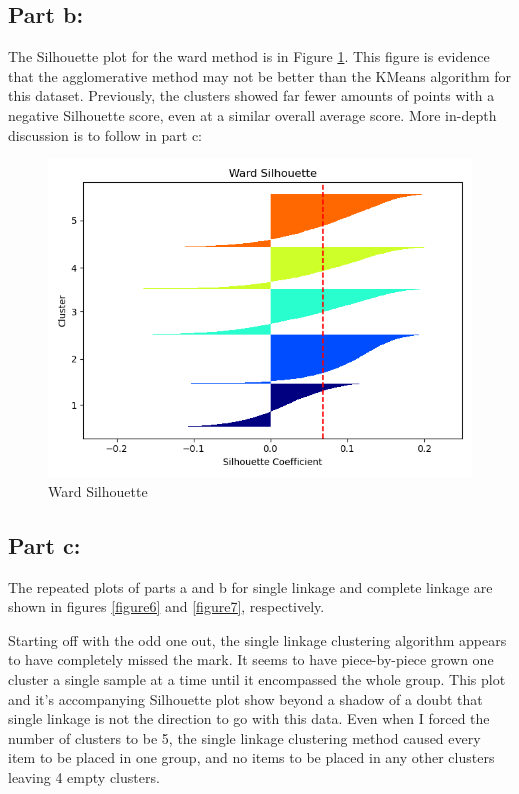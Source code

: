 \documentclass[12pt]{article}
\begin{document}
\subsection{Part b:}
The Silhouette plot for the ward method is in Figure \ref{figure5}. This figure is evidence that the agglomerative method
may not be better than the KMeans algorithm for this dataset. Previously, the clusters showed far fewer amounts of points
with a negative Silhouette score, even at a similar overall average score. More in-depth discussion is to follow in part c:
\begin{figure}
    \includegraphics{../results/agglo/Silhouette_Plot_ward.png}
    \caption{Ward Silhouette}
    \label{figure5}
\end{figure}

\subsection{Part c:}
The repeated plots of parts a and b for single linkage and complete linkage are shown in figures \ref{figure6} and \ref{figure7}, 
respectively.

Starting off with the odd one out, the single linkage clustering algorithm appears to have completely missed the mark. 
It seems to have piece-by-piece grown one cluster a single sample at a time until it encompassed the whole group. This 
plot and it's accompanying Silhouette plot show beyond a shadow of a doubt that single linkage is not the direction 
to go with this data. Even when I forced the number of clusters to be 5, the single linkage clustering method caused 
every item to be placed in one group, and no items to be placed in any other clusters leaving 4 empty clusters.
\end{document}
